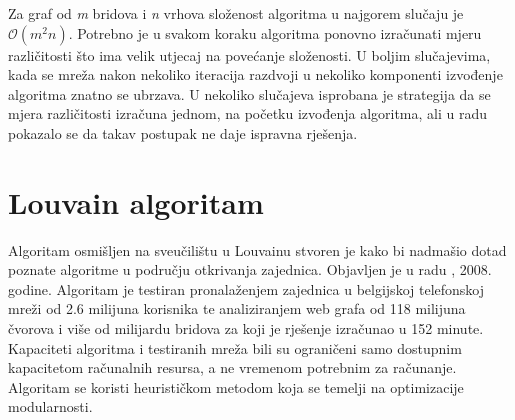 \documentclass[times, utf8, diplomski]{fer}
\begin{document}
Za graf od \textit{m} bridova i \textit{n} vrhova složenost algoritma u najgorem slučaju je $\mathcal{O}(m^{2}n)$. Potrebno je u svakom koraku algoritma ponovno izračunati mjeru različitosti što ima velik utjecaj na povećanje složenosti. U boljim slučajevima, kada se mreža nakon nekoliko iteracija razdvoji u nekoliko komponenti izvođenje algoritma znatno se ubrzava. U nekoliko slučajeva isprobana je strategija da se mjera različitosti izračuna jednom, na početku izvođenja algoritma, ali u radu \cite{girvan2002community} pokazalo se da takav postupak ne daje ispravna rješenja.

\pagebreak

\section{Louvain algoritam}

Algoritam osmišljen na sveučilištu u Louvainu stvoren je kako bi nadmašio dotad poznate algoritme u području otkrivanja zajednica. Objavljen je u radu \cite{blondel2008fast}, 2008. godine. Algoritam je testiran pronalaženjem zajednica u belgijskoj telefonskoj mreži od 2.6 milijuna korisnika te analiziranjem web grafa od 118 milijuna čvorova i više od milijardu bridova za koji je rješenje izračunao u 152 minute. Kapaciteti algoritma i testiranih mreža bili su ograničeni samo dostupnim kapacitetom računalnih resursa, a ne vremenom potrebnim za računanje. Algoritam se koristi heurističkom metodom koja se temelji na optimizacije modularnosti. 
\end{document}
